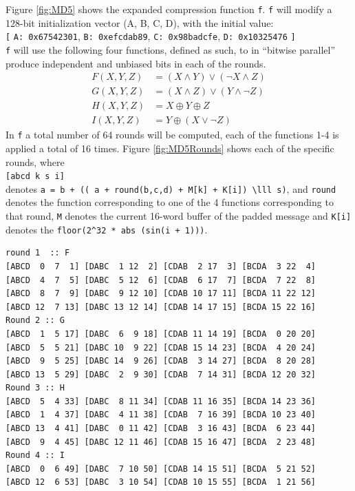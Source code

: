 \documentclass[a4paper, openany]{book}
\begin{document}
\begin{abstact}
Figure \ref{fig:MD5} shows the expanded compression function \texttt{f}. \texttt{f} will modify a 128-bit initialization vector (A, B, C, D), with the initial value:\\
\texttt{[} \texttt{A: 0x67542301}, \texttt{B: 0xefcdab89}, \texttt{C: 0x98badcfe}, \texttt{D: 0x10325476} \texttt{]}\\
\texttt{f} will use the following four functions, defined as such, to in ``bitwise parallel'' produce independent and unbiased bits in each of the rounds.
\begin{align}
F(X, Y, Z) &= (X \wedge Y) \vee (\neg X \wedge Z) \\
G(X, Y, Z) &= (X \wedge Z) \vee (Y \wedge \neg Z) \\
H(X, Y, Z) &= X \oplus Y \oplus Z \\
I(X, Y, Z) &= Y \oplus ( X \vee \neg Z)
\end{align}
In \texttt{f} a total number of 64 rounds will be computed, each of the functions 1-4 is applied a total of 16 times. Figure \ref{fig:MD5Rounds} shows each of the specific rounds, where\\
\texttt{[abcd k s i]}\\
denotes \texttt{a = b + (( a + round(b,c,d) + M[k] + K[i]) \textbackslash{}lll s)}, and \texttt{round} denotes the function corresponding to one of the 4 functions corresponding to that round, \texttt{M} denotes the current 16-word buffer of the padded message and \texttt{K[i]} denotes the \texttt{floor(2\textasciicircum{}32 * abs (sin(i + 1)))}.
\begin{table}[H]
\centering
\begin{verbatim}
round 1  :: F
[ABCD  0  7  1] [DABC  1 12  2] [CDAB  2 17  3] [BCDA  3 22  4]
[ABCD  4  7  5] [DABC  5 12  6] [CDAB  6 17  7] [BCDA  7 22  8]
[ABCD  8  7  9] [DABC  9 12 10] [CDAB 10 17 11] [BCDA 11 22 12]
[ABCD 12  7 13] [DABC 13 12 14] [CDAB 14 17 15] [BCDA 15 22 16]
Round 2 :: G
[ABCD  1  5 17] [DABC  6  9 18] [CDAB 11 14 19] [BCDA  0 20 20]
[ABCD  5  5 21] [DABC 10  9 22] [CDAB 15 14 23] [BCDA  4 20 24]
[ABCD  9  5 25] [DABC 14  9 26] [CDAB  3 14 27] [BCDA  8 20 28]
[ABCD 13  5 29] [DABC  2  9 30] [CDAB  7 14 31] [BCDA 12 20 32]
Round 3 :: H
[ABCD  5  4 33] [DABC  8 11 34] [CDAB 11 16 35] [BCDA 14 23 36]
[ABCD  1  4 37] [DABC  4 11 38] [CDAB  7 16 39] [BCDA 10 23 40]
[ABCD 13  4 41] [DABC  0 11 42] [CDAB  3 16 43] [BCDA  6 23 44]
[ABCD  9  4 45] [DABC 12 11 46] [CDAB 15 16 47] [BCDA  2 23 48]
Round 4 :: I
[ABCD  0  6 49] [DABC  7 10 50] [CDAB 14 15 51] [BCDA  5 21 52]
[ABCD 12  6 53] [DABC  3 10 54] [CDAB 10 15 55] [BCDA  1 21 56]

\end{verbatim}
\end{table}
\end{abstact}
\end{document}
